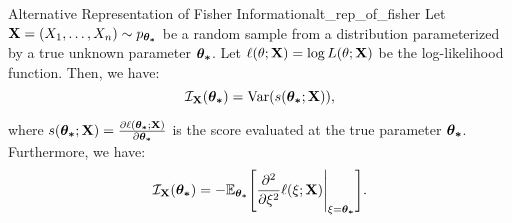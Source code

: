 \begin{proposition}{Alternative Representation of Fisher Information}{alt_rep_of_fisher}
    Let ${\bf X}=(X_1, \dots, X_n) \sim p_{\boldsymbol{\theta_*}}$ be a random sample from a distribution parameterized by a true unknown parameter $\boldsymbol{\theta_*}$. Let $\ell(\theta;{\bf X})=\log L(\theta;{\bf X})$ be the log-likelihood function. Then, we have:
    \begin{equation}
        \mathcal{I}_{{\bf X}}(\boldsymbol{\theta_*}) = \mathrm{Var}(s(\boldsymbol{\theta_*};{\bf X})), 
    \end{equation} 

    \noindent where $s(\boldsymbol{\theta_*};{\bf X})=\frac{\partial\ell(\boldsymbol{\theta_*};{\bf X})}{\partial\boldsymbol{\theta_*}}$ is the score evaluated at the true parameter $\boldsymbol{\theta_*}$. Furthermore, we have:
    \begin{equation}
        \mathcal{I}_{{\bf X}}(\boldsymbol{\theta_*}) = -\mathbb{E}_{\boldsymbol{\theta_*}}\Bigg[ \frac{\partial^2}{\partial\xi^2}\ell(\xi;{\bf X})\Bigg|_{\xi=\boldsymbol{\theta_*}} \Bigg].
    \end{equation} 
\end{proposition} 

